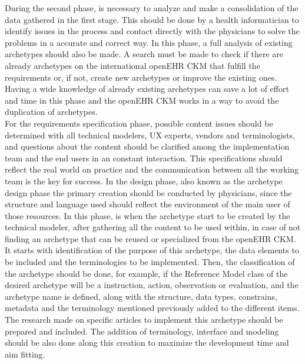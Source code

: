\documentclass[mim_thesis.tex]{subfiles}
\begin{document}
During the second phase, is necessary to analyze and make a consolidation of the data gathered in the first stage. This should be done by a health informatician to identify issues in the process and contact directly with the physicians to solve the problems in a accurate and correct way. In this phase, a full analysis of existing archetypes should also be made. A search must be made to check if there are already archetypes on the international openEHR CKM that fulfill the requirements or, if not, create new archetypes or improve the existing ones. Having a wide knowledge of already existing archetypes can save a lot of effort and time in this phase and the openEHR CKM works in a way to avoid the duplication of archetypes. \\

For the requirements specification phase, possible content issues should be determined with all technical modelers, \ac{UX} experts, vendors and terminologists, and questions about the content should be clarified among the implementation team and the end users in an constant interaction. This specifications should reflect the real world on practice \citep{hovenga2013health} and the communication between all the working team is the key for success. In the design phase, also known as the archetype design phase \citep{Madsen2010} \citep{beale2007archetype} the primary creation should be conducted by physicians, since the structure and language used should reflect the environment of the main user of those resources. In this phase, is when the archetype start to be created by the technical modeler, after gathering all the content to be used within, in case of not finding an archetype that can be reused or specialized from the openEHR CKM. It starts with identification of the purpose of this archetype, the data elements to be included and the terminologies to be implemented. Then, the classification of the archetype should be done, for example, if the Reference Model class of the desired archetype will be a instruction, action, observation or evaluation, and the archetype name is defined, along with the structure, data types, constrains, metadata and the terminology mentioned previously added to the different items. The research made on specific articles to implement this archetype should be prepared and included. The addition of terminology, interface and modeling should be also done along this creation to maximize the development time and aim fitting. \\
\end{document}
